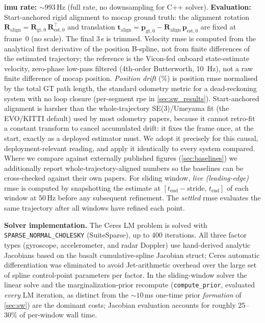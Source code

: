 \textbf{\ac{imu} rate:} $\sim$993\,Hz (full rate, no downsampling for C++ solver).
\textbf{Evaluation:} Start-anchored rigid alignment to \ac{mocap} ground
truth: the alignment rotation $\mathbf{R}_\mathrm{align} =
\mathbf{R}_{\mathrm{gt},0}\,\mathbf{R}_{\mathrm{est},0}^\top$
and translation $\mathbf{t}_\mathrm{align} =
\mathbf{p}_{\mathrm{gt},0} - \mathbf{R}_\mathrm{align}\,
\mathbf{p}_{\mathrm{est},0}$ are fixed at frame~0 (no scale).
The final 3\,s is trimmed.  Velocity \ac{rmse} is computed from the
analytical first derivative of the position B-spline, not from finite
differences of the estimated trajectory; the reference is the Vicon-fed
onboard state-estimate velocity, zero-phase low-pass filtered (4th-order
Butterworth, \SI{10}{\hertz}), not a raw finite difference of \ac{mocap}
position.
\emph{Position drift} (\%) is position \ac{rmse} normalised by the total
GT path length, the standard odometry metric for a
dead-reckoning system with no loop closure (per-segment \ac{rpe} in
\autoref{sec:sw_results}).
Start-anchored alignment is harsher than the whole-trajectory
SE(3)/Umeyama fit (the EVO/KITTI default) used by most odometry papers,
because it cannot retro-fit a constant transform to cancel accumulated
drift: it fixes the frame once, at the start, exactly as a deployed
estimator must.  We adopt it precisely for this causal,
deployment-relevant reading, and apply it identically to every system
compared.  Where we compare against externally published figures
(\autoref{sec:baselines}) we additionally report whole-trajectory-aligned
numbers so the baselines can be cross-checked against their own papers.
For sliding window, \emph{live (leading-edge)} \ac{rmse} is computed by
snapshotting the estimate at $[t_\text{end}{-}\text{stride},\, t_\text{end}]$
of each window at 50\,Hz before any subsequent refinement.  The
\emph{settled} \ac{rmse} evaluates the same trajectory after all windows
have refined each point.

\textbf{Solver implementation.}
The Ceres LM problem is solved with \texttt{SPARSE\_NORMAL\_CHOLESKY}
(SuiteSparse), up to 400 iterations.
All three factor types (gyroscope, accelerometer, and radar Doppler)
use hand-derived analytic Jacobians based on the basalt
cumulative-spline Jacobian struct; Ceres automatic differentiation was
eliminated to avoid Jet-arithmetic overhead over the large set of
spline control-point parameters per factor.
In the sliding-window solver the linear solve and the
marginalization-prior recompute (\texttt{compute\_prior}, evaluated
\emph{every} LM iteration, as distinct from the ${\sim}10$\,ms one-time
prior \emph{formation} of \autoref{sec:sw}) are the dominant costs;
Jacobian evaluation accounts for roughly 25--30\% of per-window wall time.
